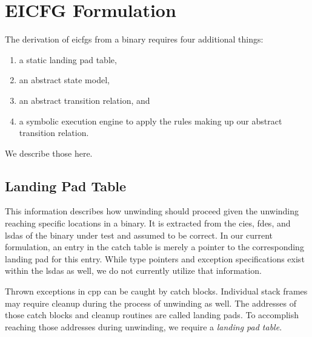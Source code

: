 \chapter{EICFG Formulation}\label{ch:eicfg-formulation}

The derivation of \acp{eicfg} from a binary requires four additional things:
\begin{enumerate}
    \item a static landing pad table,
    \item an abstract state model,
    \item an abstract transition relation, and
    \item a symbolic execution engine to apply the rules making up our abstract transition relation.
\end{enumerate}
We describe those here.

\section{Landing Pad Table}\label{sec:landing-pad-table}
This information describes how unwinding should proceed given the unwinding reaching specific locations in a binary.
It is extracted from the \acp{cie}, \acp{fde}, and \acp{lsda} of the binary under test and assumed to be correct.
In our current formulation, an entry in the catch table is merely a pointer to the corresponding landing pad for this entry.
While type pointers and exception specifications exist within the \acp{lsda} as well, we do not currently utilize that information.

Thrown exceptions in \gls{cpp} can be caught by catch blocks.
Individual stack frames may require cleanup during the process of unwinding as well.
The addresses of those catch blocks and cleanup routines are called landing pads.
To accomplish reaching those addresses during unwinding, we require a \emph{landing pad table}.

